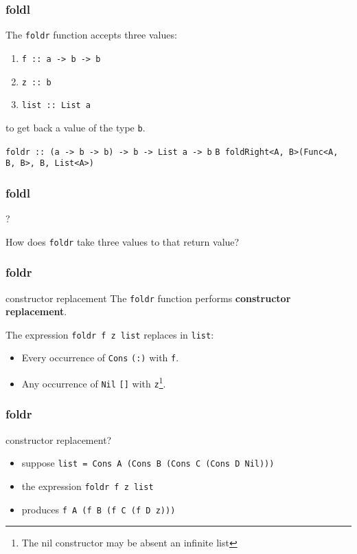 \begin{frame}
\frametitle{foldl}
The \lstinline[basicstyle=\ttfamily]$foldr$ function accepts three values:
\begin{enumerate}
\item \lstinline[basicstyle=\ttfamily]$f :: a -> b -> b$
\item \lstinline[basicstyle=\ttfamily]$z :: b$
\item \lstinline[basicstyle=\ttfamily]$list :: List a$
\end{enumerate}
to get back a value of the type \lstinline[basicstyle=\ttfamily]$b$.

\hrulefill

\lstinline[basicstyle=\ttfamily]$foldr :: (a -> b -> b) -> b -> List a -> b$
\lstinline[basicstyle=\ttfamily]$B foldRight<A, B>(Func<A, B, B>, B, List<A>)$
\end{frame}

\begin{frame}
\frametitle{foldl}
\begin{block}{?}
\begin{center}
How does \lstinline[basicstyle=\ttfamily]$foldr$ take three values to that return value?
\end{center}
\end{block}
\end{frame}

\begin{frame}
\frametitle{foldr}
\begin{block}{constructor replacement}
The \lstinline[basicstyle=\ttfamily]$foldr$ function performs \textbf{constructor replacement}.
\end{block}
The expression \lstinline[basicstyle=\ttfamily]$foldr f z list$ replaces in \lstinline[basicstyle=\ttfamily]$list$:
\begin{itemize}
\item Every occurrence of \lstinline{Cons} \lstinline[basicstyle=\ttfamily]$(:)$ with \lstinline[basicstyle=\ttfamily]$f$.
\item Any occurrence of \lstinline{Nil} \lstinline[basicstyle=\ttfamily]$[]$ with \lstinline[basicstyle=\ttfamily]$z$\footnote{The nil constructor may be absent \textemdash an infinite list}.
\end{itemize}
\end{frame}

\begin{frame}
\frametitle{foldr}
\begin{block}{constructor replacement?}
\small
\begin{itemize}
\item suppose \lstinline[basicstyle=\ttfamily]$list = Cons A (Cons B (Cons C (Cons D Nil)))$
\item the expression \lstinline[basicstyle=\ttfamily, mathescape]!foldr f z list!
\item produces \lstinline[basicstyle=\ttfamily]$f A (f B (f C (f D z)))$
\end{itemize}
\end{block}
\end{frame}

